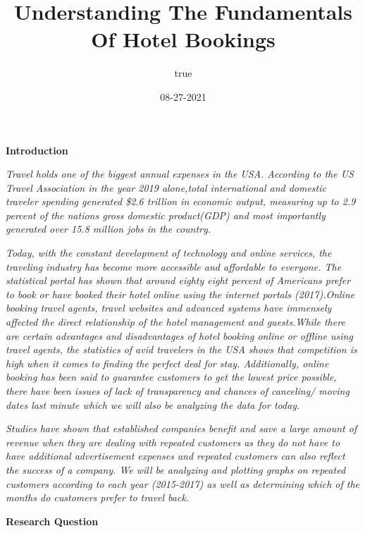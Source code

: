 \documentclass[
]{article}
\title{Understanding The Fundamentals Of Hotel Bookings}
\author{true}
\date{08-27-2021}
\begin{document}
\maketitle

\textbf{Introduction}

\emph{Travel holds one of the biggest annual expenses in the USA.
According to the US Travel Association in the year 2019 alone,total
international and domestic traveler spending generated \$2.6 trillion in
economic output, measuring up to 2.9 percent of the nations gross
domestic product(GDP) and most importantly generated over 15.8 million
jobs in the country.}

\emph{Today, with the constant development of technology and online
services, the traveling industry has become more accessible and
affordable to everyone. The statistical portal has shown that around
eighty eight percent of Americans prefer to book or have booked their
hotel online using the internet portals (2017).Online booking travel
agents, travel websites and advanced systems have immensely affected the
direct relationship of the hotel management and guests.While there are
certain advantages and disadvantages of hotel booking online or offline
using travel agents, the statistics of avid travelers in the USA shows
that competition is high when it comes to finding the perfect deal for
stay. Additionally, online booking has been said to guarantee customers
to get the lowest price possible, there have been issues of lack of
transparency and chances of canceling/ moving dates last minute which we
will also be analyzing the data for today.}

\emph{Studies have shown that established companies benefit and save a
large amount of revenue when they are dealing with repeated customers as
they do not have to have additional advertisement expenses and repeated
customers can also reflect the success of a company. We will be
analyzing and plotting graphs on repeated customers according to each
year (2015-2017) as well as determining which of the months do customers
prefer to travel back.}

\textbf{Research Question}
\end{document}
